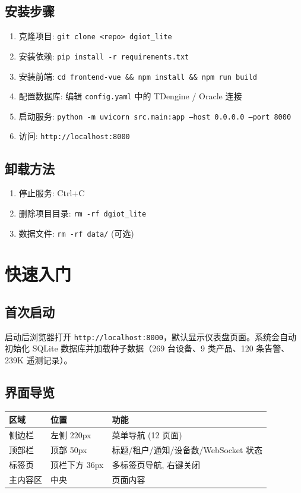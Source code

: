 \documentclass[12pt,a4paper]{ctexart}
\begin{document}
\subsection{安装步骤}
\begin{enumerate}[leftmargin=*]
  \item 克隆项目: \texttt{git clone <repo> dgiot\_lite}
  \item 安装依赖: \texttt{pip install -r requirements.txt}
  \item 安装前端: \texttt{cd frontend-vue \&\& npm install \&\& npm run build}
  \item 配置数据库: 编辑 \texttt{config.yaml} 中的 TDengine / Oracle 连接
  \item 启动服务: \texttt{python -m uvicorn src.main:app --host 0.0.0.0 --port 8000}
  \item 访问: \texttt{http://localhost:8000}
\end{enumerate}

\subsection{卸载方法}
\begin{enumerate}[leftmargin=*]
  \item 停止服务: Ctrl+C
  \item 删除项目目录: \texttt{rm -rf dgiot\_lite}
  \item 数据文件: \texttt{rm -rf data/} (可选)
\end{enumerate}

\section{快速入门}

\subsection{首次启动}
启动后浏览器打开 \texttt{http://localhost:8000}，默认显示仪表盘页面。系统会自动初始化 SQLite 数据库并加载种子数据（269 台设备、9 类产品、120 条告警、239K 遥测记录）。

\subsection{界面导览}
\begin{table}[H]\centering
\begin{tabular}{p{3cm}p{5cm}p{5cm}}
\toprule
\textbf{区域} & \textbf{位置} & \textbf{功能} \\
\midrule
侧边栏 & 左侧 220px & 菜单导航 (12 页面) \\
顶部栏 & 顶部 50px & 标题/租户/通知/设备数/WebSocket 状态 \\
标签页 & 顶栏下方 36px & 多标签页导航, 右键关闭 \\
主内容区 & 中央 & 页面内容 \\
\bottomrule
\end{tabular}
\end{table}
\end{document}
